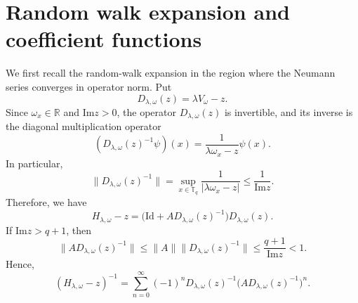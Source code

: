 \documentclass[a4paper,11pt]{article}
\newcommand{\Id}{\mathrm{Id}}
\newcommand{\Impart}{\mathrm{Im}}
\begin{document}
\section{Random walk expansion and coefficient functions}\label{sec:randomwalkexpansion}

We first recall the random-walk expansion in the region where the
Neumann series converges in operator norm. 
Put
$$
D_{\lambda,\omega}(z)=\lambda V_\omega-z.
$$
Since $\omega_x\in\mathbb R$ and $\Impart z>0$, the operator
$D_{\lambda,\omega}(z)$ is invertible, 
and its inverse is the diagonal multiplication operator
$$
(D_{\lambda,\omega}(z)^{-1}\psi)(x)=\frac{1}{\lambda\omega_x-z}\psi(x).
$$
In particular,
$$
\|D_{\lambda,\omega}(z)^{-1}\|=\sup_{x\in\mathbb T_q}\frac{1}{|\lambda\omega_x-z|}
\le\frac{1}{\Impart z}.
$$
Therefore, we have
$$
H_{\lambda,\omega}-z=
\bigl(\Id+A D_{\lambda,\omega}(z)^{-1}\bigr)D_{\lambda,\omega}(z).
$$
If $\Impart z>q+1$, then
$$
\|A D_{\lambda,\omega}(z)^{-1}\|
\le
\|A\|\|D_{\lambda,\omega}(z)^{-1}\|
\le
\frac{q+1}{\Impart z}<1.
$$
Hence,
\begin{equation}
\label{eq:resolvent-neumann}
(H_{\lambda,\omega}-z)^{-1}=\sum_{n=0}^{\infty}(-1)^n
D_{\lambda,\omega}(z)^{-1} \bigl(A D_{\lambda,\omega}(z)^{-1}\bigr)^n.
\end{equation}
\end{document}

